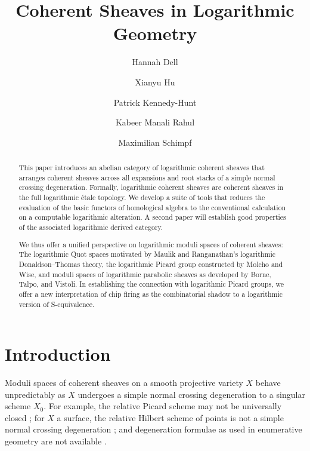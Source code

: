 \documentclass[11pt]{amsart}
\title{Coherent Sheaves in Logarithmic Geometry}
\author{Hannah Dell}
\author{Xianyu Hu}
\author{Patrick Kennedy-Hunt}
\author{Kabeer Manali Rahul}
\author{Maximilian Schimpf}
\theoremstyle{definition}
\theoremstyle{definition}
\begin{document}
\begin{abstract}
This paper introduces an abelian category of logarithmic coherent sheaves that arranges coherent sheaves across all expansions and root stacks of a simple normal crossing degeneration. Formally, logarithmic coherent sheaves are coherent sheaves in the full logarithmic \'etale topology.
We develop a suite of tools that reduces the evaluation of the basic functors of homological algebra to the conventional calculation on a computable logarithmic alteration. A second paper will establish good properties of the associated logarithmic derived category.

We thus offer a unified perspective on logarithmic moduli spaces of coherent sheaves: The logarithmic Quot spaces motivated by Maulik and Ranganathan's logarithmic Donaldson--Thomas theory, the logarithmic Picard group constructed by Molcho and Wise, and moduli spaces of logarithmic parabolic sheaves as developed by Borne, Talpo, and Vistoli. In establishing the connection with logarithmic Picard groups, we offer a new interpretation of chip firing as the combinatorial shadow to a logarithmic version of S-equivalence.
\end{abstract}

\maketitle

\tableofcontents

\section*{Introduction}
Moduli spaces of coherent sheaves on a smooth projective variety $X$ behave unpredictably as $X$ undergoes a simple normal crossing degeneration to a singular scheme $X_0$. For example, the relative Picard scheme may not be universally closed \cite{AltmanKleiman1979,AltmanKleiman1980,DSouza1979Compactification,Ishida1978,OdaSeshadri1979}; for $X$ a surface, the relative Hilbert scheme of points is not a simple normal crossing degeneration \cite{GulbrandsenHalleHulek2019,Wu-Li-Good-degeneration-of-Quot-schemes-and-coherent-systems,shafi2025logarithmic,tschanz2023expansions,tschanz2024good}; and degeneration formulae as used in enumerative geometry are not available \cite{KuhnGluing,Wu-Li-Good-degeneration-of-Quot-schemes-and-coherent-systems,maulik2024logarithmic,maulik2025logarithmic}. 
\end{document}
